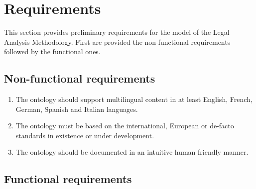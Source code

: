 \section{Requirements}
\label{ariaid-title4}

This section provides preliminary requirements for the model of the Legal Analysis Methodology. First are provided the non-functional requirements followed by the functional ones. 

\subsection{Non-functional requirements}
\label{non-functional-requirements}

\begin{enumerate}

\item
  The ontology should support multilingual content in at least English,
  French, German, Spanish and Italian languages.
\item
  The ontology must be based on the international, European or de-facto
  standards in existence or under development.
\item
  The ontology should be documented in an intuitive human friendly
  manner.
\end{enumerate}

\subsection{Functional requirements}
\label{functional-requirements}

